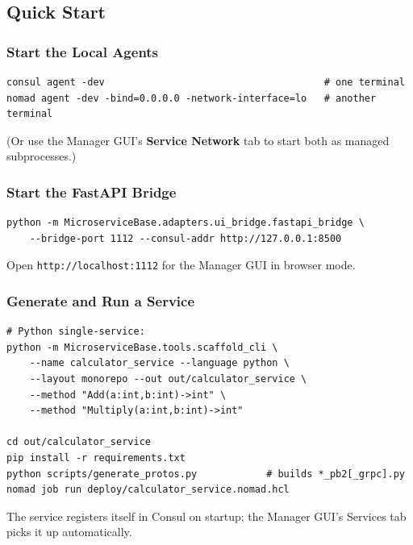 \subsection{Quick Start}

\subsubsection{Start the Local Agents}

\begin{verbatim}
consul agent -dev                                      # one terminal
nomad agent -dev -bind=0.0.0.0 -network-interface=lo   # another terminal
\end{verbatim}

\noindent
(Or use the Manager GUI's \textbf{Service Network} tab to start both as managed
subprocesses.)

\subsubsection{Start the FastAPI Bridge}

\begin{verbatim}
python -m MicroserviceBase.adapters.ui_bridge.fastapi_bridge \
    --bridge-port 1112 --consul-addr http://127.0.0.1:8500
\end{verbatim}

\noindent
Open \texttt{http://localhost:1112} for the Manager GUI in browser mode.

\subsubsection{Generate and Run a Service}

\begin{verbatim}
# Python single-service:
python -m MicroserviceBase.tools.scaffold_cli \
    --name calculator_service --language python \
    --layout monorepo --out out/calculator_service \
    --method "Add(a:int,b:int)->int" \
    --method "Multiply(a:int,b:int)->int"

cd out/calculator_service
pip install -r requirements.txt
python scripts/generate_protos.py            # builds *_pb2[_grpc].py
nomad job run deploy/calculator_service.nomad.hcl
\end{verbatim}

\noindent
The service registers itself in Consul on startup; the Manager GUI's Services tab
picks it up automatically.

